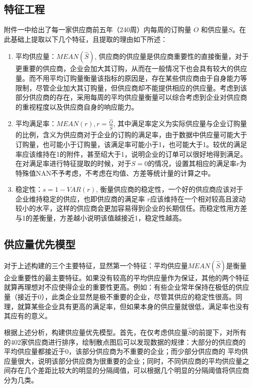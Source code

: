 \documentclass{my_paper}
\begin{document}
\subsection{特征工程}
附件一中给出了每一家供应商前五年（240周）内每周的订购量 $O$ 和供应量$S$。在此基础上提取以下几个特征，且提取的理由如下所述：

\begin{enumerate}

\item 平均供应量：$MEAN(\hat{S})$, 供应商的供应量是供应商重要性的直接衡量，对于更重要的供应商，企业会加大其订购，从而在一般情况下也会具有较大的供应量。而不用平均订购量衡量该指标的原因是，存在某些供应商由于自身能力等限制，尽管企业加大其订购量，但供应商却不能提供相应的供应量。考虑到该部分供应商的存在，采用每周的平均供应量衡量可以综合考虑到企业对供应商的重视程度以及供应商自身的响应能力。

\item 平均满足率：$MEAN(r),r = \frac{\hat{O}}{\hat{S}}$, 其中满足率定义为实际供应量与企业订购量的比例，含义为供应商对于企业的订购的满足率，由于数据中供应量可能大于订购量，也可能小于订购量，该满足率可能小于1，也可能大于1。较优的满足率应该维持在1的附件，甚至绍大于1，说明企业的订单可以很好地得到满足。在对满足率进行特征提取的时候，对于$S=0$的情况，设置其相应的满足率$r$为特殊值NAN不予考虑，不考虑在均值、方差等统计量的计算之中。

\item  稳定性：$s = 1- VAR(r)$, 衡量供应商的稳定性，一个好的供应商应该对于企业维持稳定的供应，也即供应商的满足率 $r$应该维持在一个相对较高且波动较小的水平，这样的供应商会更加容易得到企业的长期信任。而稳定性用方差与1的差衡量，方差越小说明该值越接近1，稳定性越高。

\end{enumerate}

\subsection{供应量优先模型}

对于上述构建的三个主要特征，显然第一个特征：平均供应量$MEAN(\hat{S})$是衡量企业重要性的最主要特征。如果没有较高的平均供应量作为保证，其他的两个特征就算再理想对不应使得企业的重要性更高。例如：有些企业常年保持在极低的供应量（接近于0），此类企业显然是极不重要的企业，尽管其供应的稳定性很高。同理，就算某些企业具有更高的满足率，但如果本身的供应量就很低，满足率也没有其应有的意义。

根据上述分析，构建供应量优先模型。首先，在仅考虑供应量$\hat{S}$的前提下，对所有的402家供应商进行排序，绘制散点图后可以发现数据的规律：大部分的供应商的平均供应量都接近于0，该部分供应商为不重要的企业；而少部分供应商的
平均供应量很大，说明该部分供应商为很重要的企业；同时，不同供应商的平均供应量之间存在几个差距比较大的明显的分隔阈值，可以根据几个明显的分隔阈值将供应商分为几类。
\end{document}
